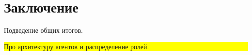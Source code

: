 \documentclass[a4paper, 12pt]{article}
\theoremstyle{plain}
\begin{document}
	\section*{Заключение} Подведение общих итогов.
	
	\noindent\colorbox{yellow}{
		\parbox{\dimexpr\linewidth-2\fboxsep}{Про архитектуру агентов и распределение ролей.}
	}
	
	
	
\end{document}

